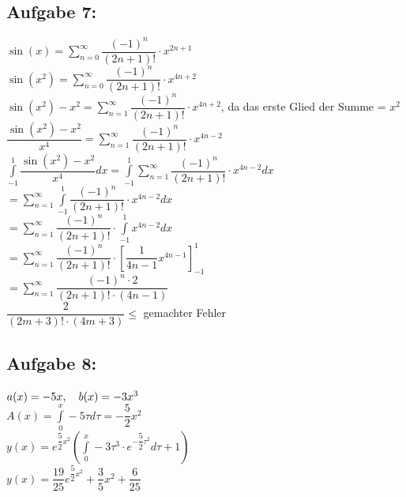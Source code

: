 \documentclass[11pt,final]{scrreprt}
\newcommand{\br} {\medskip\\}
\begin{document}
\subsection*{Aufgabe 7:}

\hspace*{2em} $\sin(x) = \sum\limits_{n=0}^\infty \dfrac{(-1)^n}{(2n+1)!} \cdot x^{2n+1}$\br
\hspace*{2em} $ \sin(x^2) = \sum\limits_{n=0}^\infty \dfrac{(-1)^n}{(2n+1)!} \cdot x^{4n+2} $\br
\hspace*{2em} $ \sin(x^2)-x^2 = \sum\limits_{n=1}^\infty \dfrac{(-1)^n}{(2n+1)!} \cdot x^{4n+2} $, da das erste Glied der Summe = $x^2$\br
\hspace*{2em} $ \dfrac{\sin(x^2)-x^2}{x^4} = \sum\limits_{n=1}^\infty \dfrac{(-1)^n}{(2n+1)!} \cdot x^{4n-2} $\br
\hspace*{2em} $ \int\limits_{-1}^1\dfrac{\sin(x^2)-x^2}{x^4} dx = \int\limits_{-1}^1\sum\limits_{n=1}^\infty \dfrac{(-1)^n}{(2n+1)!} \cdot x^{4n-2} dx$\br
\hspace*{2em} $ = \sum\limits_{n=1}^\infty\int\limits_{-1}^1 \dfrac{(-1)^n}{(2n+1)!} \cdot x^{4n-2} dx $\br
\hspace*{2em} $ =\sum\limits_{n=1}^\infty \dfrac{(-1)^n}{(2n+1)!} \cdot \int\limits_{-1}^1 x^{4n-2} dx $\br
\hspace*{2em} $ =\sum\limits_{n=1}^\infty \dfrac{(-1)^n}{(2n+1)!} \cdot [\dfrac{1}{4n-1}x^{4n-1}]_{-1}^1$\\
\hspace*{2em} $ =\sum\limits_{n=1}^\infty \dfrac{(-1)^n\cdot 2}{(2n+1)!\cdot (4n-1)}$\br
\hspace*{2em} $ \dfrac{2}{(2m+3)!\cdot (4m+3)} \leq $ gemachter Fehler\\

\subsection*{Aufgabe 8:}
\hspace*{2em}$ a(x) = -5x , \hspace*{1em}b(x) = -3x^3 $\\
\hspace*{2em}$ A(x) = \int\limits_0^x -5\tau d\tau = -\dfrac{5}{2}x^2 $\\
\hspace*{2em}$ y(x) = e^{\dfrac{5}{2}x^2}\left( \int\limits_0^x -3\tau^3\cdot e^{-\dfrac{5}{2}\tau^2} d\tau + 1 \right)$\\
\hspace*{2em}$ y(x) = \dfrac{19}{25}e^{\dfrac{5}{2}x^2}+\dfrac{3}{5}x^2+\dfrac{6}{25} $\br
\end{document}
